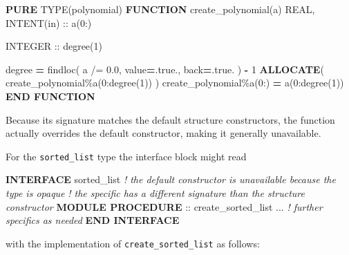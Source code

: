 \documentclass[
]{scrartcl}
\newenvironment{Shaded}{}{}
\newcommand{\CommentTok}[1]{\textcolor[rgb]{0.38,0.63,0.69}{\textit{#1}}}
\newcommand{\ConstantTok}[1]{\textcolor[rgb]{0.53,0.00,0.00}{#1}}
\newcommand{\DataTypeTok}[1]{\textcolor[rgb]{0.56,0.13,0.00}{#1}}
\newcommand{\DecValTok}[1]{\textcolor[rgb]{0.25,0.63,0.44}{#1}}
\newcommand{\FloatTok}[1]{\textcolor[rgb]{0.25,0.63,0.44}{#1}}
\newcommand{\FunctionTok}[1]{\textcolor[rgb]{0.02,0.16,0.49}{#1}}
\newcommand{\KeywordTok}[1]{\textcolor[rgb]{0.00,0.44,0.13}{\textbf{#1}}}
\newcommand{\NormalTok}[1]{#1}
\newcommand{\OperatorTok}[1]{\textcolor[rgb]{0.40,0.40,0.40}{#1}}
\begin{document}
\begin{Shaded}
\begin{Highlighting}[]
\KeywordTok{PURE} \DataTypeTok{TYPE(polynomial)} \KeywordTok{FUNCTION}\NormalTok{ create\_polynomial(a)}
   \DataTypeTok{REAL}\NormalTok{, }\DataTypeTok{INTENT(in)} \DataTypeTok{::}\NormalTok{ a(}\DecValTok{0}\NormalTok{:)}

   \DataTypeTok{INTEGER} \DataTypeTok{::}\NormalTok{ degree(}\DecValTok{1}\NormalTok{)}

\NormalTok{   degree }\KeywordTok{=} \FunctionTok{findloc}\NormalTok{( a }\OperatorTok{/=} \FloatTok{0.0}\NormalTok{, }\DataTypeTok{value}\KeywordTok{=}\ConstantTok{.true.}\NormalTok{, back}\KeywordTok{=}\ConstantTok{.true.}\NormalTok{ ) }\KeywordTok{{-}} \DecValTok{1}
   \KeywordTok{ALLOCATE}\NormalTok{( create\_polynomial}\OperatorTok{\%}\NormalTok{a(}\DecValTok{0}\NormalTok{:degree(}\DecValTok{1}\NormalTok{)) )}
\NormalTok{   create\_polynomial}\OperatorTok{\%}\NormalTok{a(}\DecValTok{0}\NormalTok{:) }\KeywordTok{=}\NormalTok{ a(}\DecValTok{0}\NormalTok{:degree(}\DecValTok{1}\NormalTok{))}
\KeywordTok{END FUNCTION}
\end{Highlighting}
\end{Shaded}

Because its signature matches the default structure
constructor\textquotesingle s, the function actually overrides the
default constructor, making it generally unavailable.

For the \texttt{sorted\_list} type the interface block might read

\begin{Shaded}
\begin{Highlighting}[]
\KeywordTok{INTERFACE}\NormalTok{ sorted\_list}
\CommentTok{! the default constructor is unavailable because the type is opaque}
\CommentTok{! the specific has a different signature than the structure constructor}
   \KeywordTok{MODULE PROCEDURE} \DataTypeTok{::}\NormalTok{ create\_sorted\_list}
\NormalTok{   ... }\CommentTok{! further specifics as needed}
\KeywordTok{END INTERFACE}
\end{Highlighting}
\end{Shaded}

with the implementation of \texttt{create\_sorted\_list} as follows:
\end{document}
